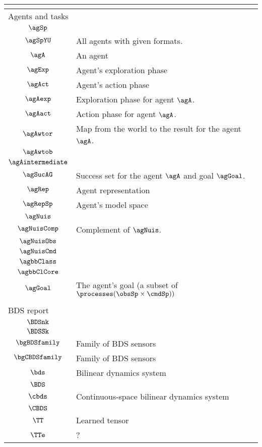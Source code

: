 \begin{longtable}{cl}
\multicolumn{2}{l}{}\\ 
 \hline
\hline
\multicolumn{2}{l}{Agents and tasks}\\ 
 \hline
$\agSp$ &  \\ 
 $\agSpYU$ &  All agents with given formats.\\ 
 $\agA$ &  An agent\\ 
 $\agExp$ &  Agent's exploration phase\\ 
 $\agAct$ &  Agent's action phase\\ 
 $\agAexp$ &  Exploration phase for agent $\agA$.\\ 
 $\agAact$ &   Action phase for agent $\agA$.\\ 
 $\agAwtor$ &  Map from the world to the result for the agent $\agA$.\\ 
 $\agAwtob$ &  \\ 
 $\agAintermediate$ & \\ 
 $\agSucAG$ &  Success set for the agent $\agA$ and goal $\agGoal$.\\ 
 $\agRep$ &  Agent representation\\ 
 $\agRepSp$ &  Agent's model space\\ 
 $\agNuis$ & \\ 
 $\agNuisComp$ &  Complement of $\agNuis$.\\ 
 $\agNuisObs$ & \\ 
 $\agNuisCmd$ & \\ 
 $\agbbClass$ & \\ 
 $\agbbClCore$ & \\ 
 $\agGoal$ &  The agent's goal (a subset of $\processes(\obsSp\times\cmdSp))$\\ 
 \multicolumn{2}{l}{}\\ 
 \hline
\hline
\multicolumn{2}{l}{BDS report}\\ 
 \hline
$\BDSnk$ & \\ 
 $\BDSSk$ & \\ 
 $\bgBDSfamily$ &  Family of BDS sensors\\ 
 $\bgCBDSfamily$ &  Family of BDS sensors\\ 
 $\bds$ &  Bilinear dynamics system\\ 
 $\BDS$ & \\ 
 $\cbds$ &  Continuous-space bilinear dynamics system\\ 
 $\CBDS$ & \\ 
 $\TT$ &  Learned tensor\\ 
 $\TTe$ &  ?\\ 

\end{longtable}
